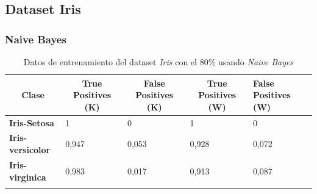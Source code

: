 \documentclass[10pt,a4paper]{article}
\begin{document}
\newpage
\subsection{Dataset Iris}
\subsubsection{Naive Bayes}
\begin{table}[h!]
	\begin{tabular}{lllll}
		\hline
		\multicolumn{1}{|c|}{\textbf{Clase}} & \multicolumn{1}{c|}{\textbf{True Positives (K)}} & \multicolumn{1}{c|}{\textbf{False Positives (K)}} & \multicolumn{1}{c|}{\textbf{True Positives (W)}} & \multicolumn{1}{l|}{\textbf{False Positives (W)}} \\ \hline
		\multicolumn{1}{|l|}{\textbf{Iris-Setosa}} & \multicolumn{1}{l|}{1}          & \multicolumn{1}{l|}{0}          & \multicolumn{1}{l|}{1}          & \multicolumn{1}{l|}{0} \\ \hline
		\multicolumn{1}{|l|}{\textbf{Iris-versicolor}} & \multicolumn{1}{l|}{0,947}          & \multicolumn{1}{l|}{0,053}          & \multicolumn{1}{l|}{0,928}          & \multicolumn{1}{l|}{0,072} \\ \hline
		\multicolumn{1}{|l|}{\textbf{Iris-virginica}} & \multicolumn{1}{l|}{0,983}          & \multicolumn{1}{l|}{0,017}          & \multicolumn{1}{l|}{0,913}          & \multicolumn{1}{l|}{0,087}\\ \hline
		\textbf{}                       &                                &                                &                                &                      
 
	\end{tabular}
	\caption{Datos de entrenamiento del dataset \emph{Iris} con el 80\% usando \emph{Naive Bayes}}
	\label{tab:iris_bayes_80}
\end{table}
\end{document}
